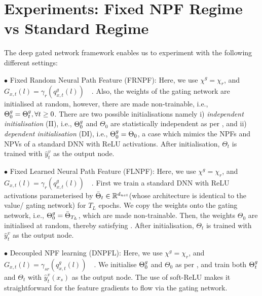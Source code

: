 \section{Experiments: Fixed NPF Regime vs  Standard Regime}\label{sec:generalisation}
The deep gated network framework enables us to experiment with the following different settings:

$\bullet$ Fixed Random Neural Path Feature (FRNPF): Here, we use $\chi^g=\chi_r$, and $ G_{x,t}(l)= \gamma_{r}\left(q^g_{x,t}(l)\right)\quad$. Also, the weights of the gating network are initialised at random, however, there are made non-trainable, i.e., ${\Theta}^g_0={\Theta}^g_t,\forall t\geq 0$. There are two possible initialisations namely i) \emph{independent initialisation} (II), i.e., ${\Theta}^g_0$ and $\Theta_0$ are statistically independent as per , and ii) \emph{dependent initialisation} (DI), i.e., ${\Theta}^g_0=\Theta_0$, a case which mimics the NPFs and NPVs of a standard DNN with ReLU activations. After initialisation, $\Theta_t$ is trained with $\hat{y}^v_t$ as the output node.

$\bullet$  Fixed Learned Neural Path Feature (FLNPF): Here, we use $\chi^g=\chi_r$, and $ G_{x,t}(l)= \gamma_{r}\left(q^g_{x,t}(l)\right)\quad$. First we train a standard DNN with ReLU activations parameterised by $\bar{\Theta}_t\in\mathbb{R}^{d_{net}}$(whose architecture is identical to the value/ gating network) for $T_{L}$ epochs. We copy the weights onto the gating network, i.e., ${\Theta}^g_0=\bar{\Theta}_{T_{L}}$, which are made non-trainable. Then, the weights $\Theta_0$ are initialised at random, thereby satisfying . After initialisation, $\Theta_t$ is trained with $\hat{y}^v_t$ as the output node.

$\bullet$ Decoupled NPF learning (DNPFL): Here, we use $\chi^g=\chi_r$, and $ G_{x,t}(l)= \gamma_{sr}\left(q^g_{x,t}(l)\right)\quad$. We initialise ${\Theta}^g_0$ and $\Theta_0$ as per , and train both ${\Theta}^g_t$ and $\Theta_t$ with $\hat{y}^v_t(x_s)$ as the output node. The use of soft-ReLU makes it straightforward for the feature gradients to flow via the gating network.



